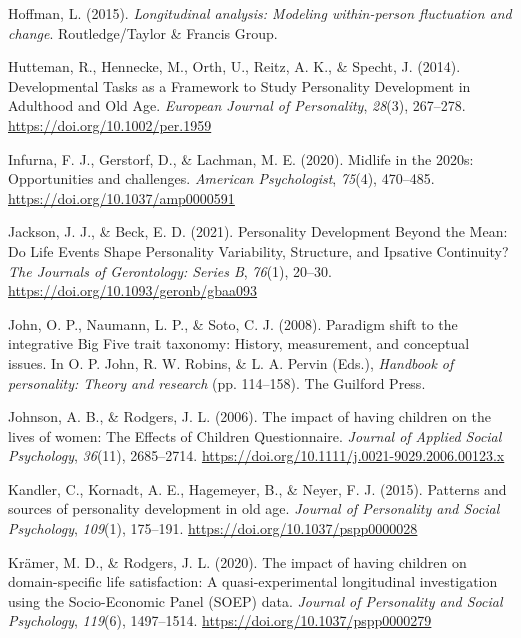 \documentclass[
  english,
  man, noextraspace]{apa7}
\begin{document}
\leavevmode\hypertarget{ref-hoffmanLongitudinalAnalysisModeling2015}{}%
Hoffman, L. (2015). \emph{Longitudinal analysis: Modeling within-person fluctuation and change}. Routledge/Taylor \& Francis Group.

\leavevmode\hypertarget{ref-huttemanDevelopmentalTasksFramework2014}{}%
Hutteman, R., Hennecke, M., Orth, U., Reitz, A. K., \& Specht, J. (2014). Developmental Tasks as a Framework to Study Personality Development in Adulthood and Old Age. \emph{European Journal of Personality}, \emph{28}(3), 267--278. \url{https://doi.org/10.1002/per.1959}

\leavevmode\hypertarget{ref-infurnaMidlife2020sOpportunities2020}{}%
Infurna, F. J., Gerstorf, D., \& Lachman, M. E. (2020). Midlife in the 2020s: Opportunities and challenges. \emph{American Psychologist}, \emph{75}(4), 470--485. \url{https://doi.org/10.1037/amp0000591}

\leavevmode\hypertarget{ref-jacksonPersonalityDevelopmentMean2021}{}%
Jackson, J. J., \& Beck, E. D. (2021). Personality Development Beyond the Mean: Do Life Events Shape Personality Variability, Structure, and Ipsative Continuity? \emph{The Journals of Gerontology: Series B}, \emph{76}(1), 20--30. \url{https://doi.org/10.1093/geronb/gbaa093}

\leavevmode\hypertarget{ref-johnParadigmShiftIntegrative2008}{}%
John, O. P., Naumann, L. P., \& Soto, C. J. (2008). Paradigm shift to the integrative Big Five trait taxonomy: History, measurement, and conceptual issues. In O. P. John, R. W. Robins, \& L. A. Pervin (Eds.), \emph{Handbook of personality: Theory and research} (pp. 114--158). The Guilford Press.

\leavevmode\hypertarget{ref-johnsonImpactHavingChildren2006}{}%
Johnson, A. B., \& Rodgers, J. L. (2006). The impact of having children on the lives of women: The Effects of Children Questionnaire. \emph{Journal of Applied Social Psychology}, \emph{36}(11), 2685--2714. \url{https://doi.org/10.1111/j.0021-9029.2006.00123.x}

\leavevmode\hypertarget{ref-kandlerPatternsSourcesPersonality2015a}{}%
Kandler, C., Kornadt, A. E., Hagemeyer, B., \& Neyer, F. J. (2015). Patterns and sources of personality development in old age. \emph{Journal of Personality and Social Psychology}, \emph{109}(1), 175--191. \url{https://doi.org/10.1037/pspp0000028}

\leavevmode\hypertarget{ref-kramerImpactHavingChildren2020}{}%
Krämer, M. D., \& Rodgers, J. L. (2020). The impact of having children on domain-specific life satisfaction: A quasi-experimental longitudinal investigation using the Socio-Economic Panel (SOEP) data. \emph{Journal of Personality and Social Psychology}, \emph{119}(6), 1497--1514. \url{https://doi.org/10.1037/pspp0000279}
\end{document}
